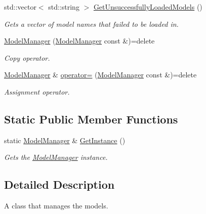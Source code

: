 \begin{DoxyCompactItemize}
std\+::vector$<$ std\+::string $>$ \mbox{\hyperlink{class_model_manager_a78e2c64a9e221d209559d3cb7a961994}{Get\+Unsuccessfully\+Loaded\+Models}} ()
\begin{DoxyCompactList}\small\item\em Gets a vector of model name\textquotesingle{}s that failed to be loaded in. \end{DoxyCompactList}\item 
\mbox{\label{class_model_manager_a6bc6a495133e0b00309f61fda56c9948}} 
\mbox{\hyperlink{class_model_manager_a6bc6a495133e0b00309f61fda56c9948}{Model\+Manager}} (\mbox{\hyperlink{class_model_manager}{Model\+Manager}} const \&)=delete
\begin{DoxyCompactList}\small\item\em Copy operator. \end{DoxyCompactList}\item 
\mbox{\label{class_model_manager_a281c631322a7a464de6c2b519d86ef1f}} 
\mbox{\hyperlink{class_model_manager}{Model\+Manager}} \& \mbox{\hyperlink{class_model_manager_a281c631322a7a464de6c2b519d86ef1f}{operator=}} (\mbox{\hyperlink{class_model_manager}{Model\+Manager}} const \&)=delete
\begin{DoxyCompactList}\small\item\em Assignment operator. \end{DoxyCompactList}\end{DoxyCompactItemize}
\subsection*{Static Public Member Functions}
\begin{DoxyCompactItemize}
\item 
static \mbox{\hyperlink{class_model_manager}{Model\+Manager}} \& \mbox{\hyperlink{class_model_manager_a8d009d3630426c44e634bfccc92004b2}{Get\+Instance}} ()
\begin{DoxyCompactList}\small\item\em Gets the \mbox{\hyperlink{class_model_manager}{Model\+Manager}} instance. \end{DoxyCompactList}\end{DoxyCompactItemize}


\subsection{Detailed Description}
A class that manages the models. 

